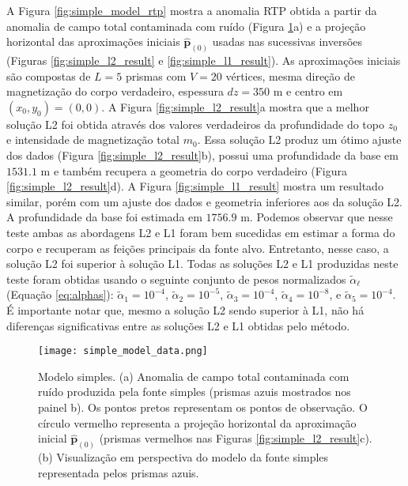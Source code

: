 A Figura \ref{fig:simple_model_rtp} mostra a anomalia RTP obtida a partir da anomalia de campo total contaminada com ruído (Figura \ref{fig:simple_model}a) e 
a projeção horizontal das aproximações iniciais $\hat{\mathbf{p}}_{(0)}$ 
usadas nas sucessivas inversões (Figuras \ref{fig:simple_l2_result} e 
\ref{fig:simple_l1_result}).
As aproximações iniciais são compostas de $ L= 5$ prismas com $ V = 20 $ vértices, mesma direção de magnetização do corpo verdadeiro, espessura $ dz=350 $ m e centro em $ (x_0, y_0) = (0, 0) $.
A Figura \ref{fig:simple_l2_result}a mostra que a melhor solução L2 foi obtida através dos valores verdadeiros da profundidade do topo $z_{0}$ e intensidade de magnetização total $m_{0}$. Essa solução L2 produz um ótimo ajuste dos dados (Figura \ref{fig:simple_l2_result}b), possui uma profundidade da base em $1531.1$ m e também recupera a geometria do corpo verdadeiro (Figura \ref{fig:simple_l2_result}d).
A Figura \ref{fig:simple_l1_result} mostra um resultado similar, porém com um ajuste dos dados e geometria inferiores aos da solução L2. A profundidade da base foi estimada em $1756.9$ m.
Podemos observar que nesse teste ambas as abordagens L2 e L1 foram bem sucedidas em estimar a forma do corpo e recuperam as feições principais da fonte alvo. Entretanto, nesse caso, a solução L2 foi superior à solução L1.
Todas as soluções L2 e L1 produzidas neste teste foram obtidas usando o seguinte conjunto de pesos normalizados $\tilde{\alpha}_{\ell}$ (Equação \ref{eq:alphas}): 
$\tilde{\alpha}_{1} = 10^{-4}$, $\tilde{\alpha}_{2} = 10^{-5}$, 
$\tilde{\alpha}_{3} = 10^{-4}$, $\tilde{\alpha}_{4} = 10^{-8}$, e 
$\tilde{\alpha}_{5} = 10^{-4}$. 
É importante notar que, mesmo a solução L2 sendo superior à L1, não há diferenças significativas entre as soluções L2 e L1 obtidas pelo método.

\begin{figure}[!htb]
	\centering
	\texttt{[image: simple\_model\_data.png]}
	\caption{Modelo simples. (a) Anomalia de campo total contaminada com ruído produzida pela fonte simples (prismas azuis mostrados nos painel b). Os pontos pretos representam os pontos de observação. O círculo vermelho representa a projeção horizontal da aproximação inicial $\hat{\mathbf{p}}_{(0)}$ (prismas vermelhos nas Figuras
		\ref{fig:simple_l2_result}c). %
		(b) Visualização em perspectiva do modelo da fonte simples representada pelos prismas azuis.
	}
	\label{fig:simple_model}
\end{figure}

